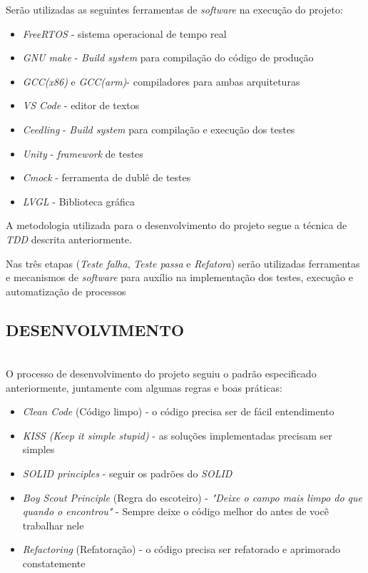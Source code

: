 \documentclass[times, twoside, watermark]{artigo}
\begin{document}
Serão utilizadas as seguintes ferramentas de \textit{software} na execução do projeto:

\begin{itemize}
\itemsep0em
  \item \textit{FreeRTOS} - sistema operacional de tempo real
  \item \textit{GNU make} - \textit{Build system} para compilação do código de produção
  \item \textit{GCC(x86)} e \textit{GCC(arm)}- compiladores para ambas arquiteturas
  \item \textit{VS Code} - editor de textos
  \item \textit{Ceedling} - \textit{Build system} para compilação e execução dos testes
  \item \textit{Unity} - \textit{framework} de testes
  \item \textit{Cmock} - ferramenta de dublê de testes
  \item \textit{LVGL} - Biblioteca gráfica
\end{itemize}

A metodologia utilizada para o desenvolvimento do projeto segue a técnica de
\textit{TDD} descrita anteriormente.

Nas três etapas (\textit{Teste falha}, \textit{Teste passa}
e \textit{Refatora}) serão utilizadas ferramentas e mecanismos de \textit{software}
para auxílio na implementação dos testes, execução e automatização de processos \hfill\


\subsection{DESENVOLVIMENTO}\hfill\\

O processo de desenvolvimento do projeto seguiu o padrão especificado anteriormente,
juntamente com algumas regras e boas práticas:

\begin{itemize}
\itemsep0em 
  \item \textit{Clean Code} (Código limpo) - o código precisa ser de fácil
        entendimento\cite{martin2009clean}
  \item \textit{KISS (Keep it simple stupid)} - as soluções implementadas precisam ser
        simples\cite{martin2018clean}
  \item \textit{SOLID principles} - seguir os padrões do \textit{SOLID}
        \cite{martin2002agile}
  \item \textit{Boy Scout Principle} (Regra do escoteiro) - \textit{"Deixe o campo mais
          limpo do que quando o encontrou"} - Sempre deixe o código melhor do antes de você
        trabalhar nele\cite{martin2009clean}
  \item \textit{Refactoring} (Refatoração) - o código precisa ser refatorado e
        aprimorado constatemente\cite{martin2009clean}
\end{itemize}
\end{document}
